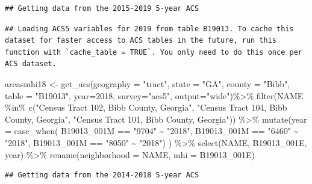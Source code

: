 \documentclass[
]{article}
\newenvironment{Shaded}{\begin{snugshade}}{\end{snugshade}}
\newcommand{\AttributeTok}[1]{\textcolor[rgb]{0.77,0.63,0.00}{#1}}
\newcommand{\DecValTok}[1]{\textcolor[rgb]{0.00,0.00,0.81}{#1}}
\newcommand{\FunctionTok}[1]{\textcolor[rgb]{0.00,0.00,0.00}{#1}}
\newcommand{\NormalTok}[1]{#1}
\newcommand{\OtherTok}[1]{\textcolor[rgb]{0.56,0.35,0.01}{#1}}
\newcommand{\SpecialCharTok}[1]{\textcolor[rgb]{0.00,0.00,0.00}{#1}}
\newcommand{\StringTok}[1]{\textcolor[rgb]{0.31,0.60,0.02}{#1}}
\begin{document}
\begin{verbatim}
## Getting data from the 2015-2019 5-year ACS
\end{verbatim}

\begin{verbatim}
## Loading ACS5 variables for 2019 from table B19013. To cache this dataset for faster access to ACS tables in the future, run this function with `cache_table = TRUE`. You only need to do this once per ACS dataset.
\end{verbatim}

\begin{Shaded}
\begin{Highlighting}[]
\NormalTok{areasmhi18 }\OtherTok{\textless{}{-}} \FunctionTok{get\_acs}\NormalTok{(}\AttributeTok{geography =} \StringTok{"tract"}\NormalTok{, }\AttributeTok{state =} \StringTok{"GA"}\NormalTok{, }\AttributeTok{county =} \StringTok{"Bibb"}\NormalTok{, }\AttributeTok{table =} \StringTok{"B19013"}\NormalTok{, }\AttributeTok{year=}\DecValTok{2018}\NormalTok{, }\AttributeTok{survey=}\StringTok{"acs5"}\NormalTok{, }\AttributeTok{output=}\StringTok{"wide"}\NormalTok{)}\SpecialCharTok{\%\textgreater{}\%}
\FunctionTok{filter}\NormalTok{(NAME }\SpecialCharTok{\%in\%} \FunctionTok{c}\NormalTok{(}\StringTok{"Census Tract 102, Bibb County, Georgia"}\NormalTok{, }\StringTok{"Census Tract 104, Bibb County, Georgia"}\NormalTok{, }\StringTok{"Census Tract 101, Bibb County, Georgia"}\NormalTok{)) }\SpecialCharTok{\%\textgreater{}\%}
\FunctionTok{mutate}\NormalTok{(}\AttributeTok{year =} \FunctionTok{case\_when}\NormalTok{(}
\NormalTok{  B19013\_001M }\SpecialCharTok{==} \StringTok{"9704"} \SpecialCharTok{\textasciitilde{}} \StringTok{"2018"}\NormalTok{,}
\NormalTok{  B19013\_001M }\SpecialCharTok{==} \StringTok{"6460"} \SpecialCharTok{\textasciitilde{}} \StringTok{"2018"}\NormalTok{,}
\NormalTok{  B19013\_001M }\SpecialCharTok{==} \StringTok{"8050"} \SpecialCharTok{\textasciitilde{}} \StringTok{"2018"}\NormalTok{) ) }\SpecialCharTok{\%\textgreater{}\%}
\FunctionTok{select}\NormalTok{(NAME, B19013\_001E, year) }\SpecialCharTok{\%\textgreater{}\%}
\FunctionTok{rename}\NormalTok{(}\AttributeTok{neighborhood =}\NormalTok{ NAME, }\AttributeTok{mhi =}\NormalTok{ B19013\_001E) }
\end{Highlighting}
\end{Shaded}

\begin{verbatim}
## Getting data from the 2014-2018 5-year ACS
\end{verbatim}
\end{document}
